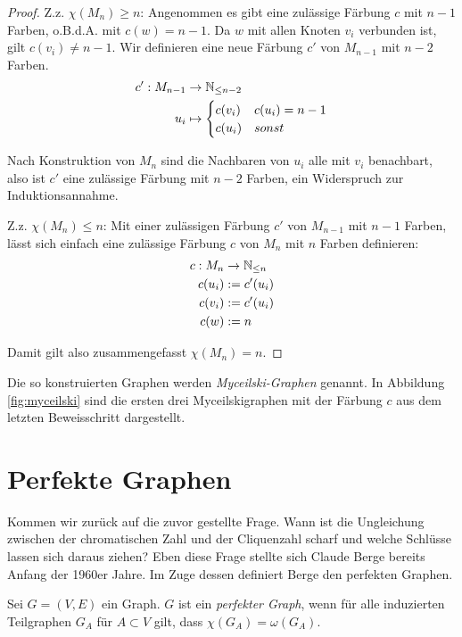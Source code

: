 \documentclass[../main.tex]{subfiles}
\begin{document}
\begin{proof}
    Z.z. $\chi(M_n) \geq n$: Angenommen es gibt eine zulässige Färbung $c$ mit $n-1$ Farben, o.B.d.A. mit $c(w) = n-1$. Da $w$ mit allen Knoten $v_i$ verbunden ist, gilt $c(v_i) \neq n-1$. Wir definieren eine neue Färbung $c'$ von $M_{n-1}$ mit $n-2$ Farben.
    \begin{align*}
        c' : M_{n-1} &\to \mathbb{N}_{\leq n-2} \\
        u_i &\mapsto \begin{cases}
            c(v_i) &c(u_i) = n-1 \\
            c(u_i) &sonst
        \end{cases}
    \end{align*}

    Nach Konstruktion von $M_n$ sind die Nachbaren von $u_i$ alle mit $v_i$ benachbart, also ist $c'$ eine zulässige Färbung mit $n-2$ Farben, ein Widerspruch zur Induktionsannahme.

    Z.z. $\chi(M_n) \leq n$: Mit einer zulässigen Färbung $c'$ von $M_{n-1}$ mit $n-1$ Farben, lässt sich einfach eine zulässige Färbung $c$ von $M_n$ mit $n$ Farben definieren:
    \begin{align*}
        c : M_n &\to \mathbb{N}_{\leq n} \\
        c(u_i) &:= c'(u_i) \\
        c(v_i) &:= c'(u_i) \\
        c(w) &:= n
    \end{align*}

    Damit gilt also zusammengefasst $\chi(M_n) = n$.
\end{proof}

Die so konstruierten Graphen werden \emph{Myceilski-Graphen} genannt. In Abbildung \ref{fig:myceilski} sind die ersten drei Myceilskigraphen mit der Färbung $c$ aus dem letzten Beweisschritt dargestellt.

\section{Perfekte Graphen}

Kommen wir zurück auf die zuvor gestellte Frage. Wann ist die Ungleichung zwischen der chromatischen Zahl und der Cliquenzahl scharf und welche Schlüsse lassen sich daraus ziehen?
Eben diese Frage stellte sich Claude Berge bereits Anfang der 1960er Jahre.
Im Zuge dessen definiert Berge den perfekten Graphen.

\begin{definition}
    Sei $G = (V, E)$ ein Graph. $G$ ist ein \emph{perfekter Graph}, wenn für alle induzierten Teilgraphen $G_A$ für $A \subset V$ gilt, dass $\chi(G_A) = \omega(G_A)$.
\end{definition}
\end{document}

